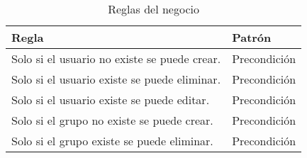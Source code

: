 \begin{longtable}{|p{10cm}|l|}
    \caption{Reglas del negocio}
    \label{table:bussiness-rules}                                                                                                                                                                                                                                                                                                          \\
    \hline
    \textbf{Regla}                                                                                                                                                                                                                                                                                                       & \textbf{Patrón} \\
    \hline
    \endfirsthead
    \hline
    Solo si el usuario no existe se puede crear.                                                                                                                                                                                                                                                                         & Precondición    \\ \hline
    Solo si el usuario existe se puede eliminar.                                                                                                                                                                                                                                                                         & Precondición    \\ \hline
    Solo si el usuario existe se puede editar.                                                                                                                                                                                                                                                                           & Precondición    \\ \hline
    Solo si el grupo no existe se puede crear.                                                                                                                                                                                                                                                                           & Precondición    \\ \hline
    Solo si el grupo existe se puede eliminar.                                                                                                                                                                                                                                                                           & Precondición    \\ \hline

\end{longtable}

